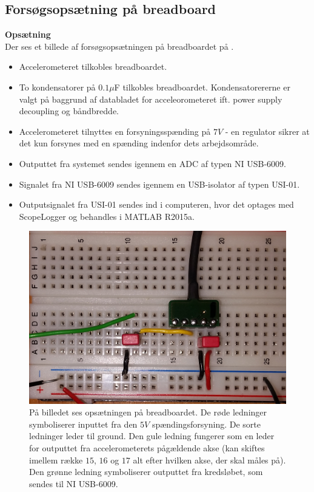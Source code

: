 \subsection{Forsøgsopsætning på breadboard}
\textbf{Opsætning}\\
Der ses et billede af forsøgsopsætningen på breadboardet på .
\begin{itemize}
\item Accelerometeret tilkobles breadboardet.
\item To kondensatorer på $0.1\mu$F tilkobles breadboardet. Kondensatorererne er valgt på baggrund af databladet for acceleorometeret ift. power supply decoupling og båndbredde.
\item Accelerometeret tilnyttes en forsyningsspænding på $7V$ - en regulator sikrer at det kun forsynes med en spænding indenfor dets arbejdsområde.
\item Outputtet fra systemet sendes igennem en ADC af typen NI USB-6009.
\item Signalet fra NI USB-6009 sendes igennem en USB-isolator af typen USI-01.
\item Outputsignalet fra USI-01 sendes ind i computeren, hvor det optages med ScopeLogger og behandles i MATLAB R2015a.
\end{itemize}

\begin{figure}[H]
	\centering
	\includegraphics[scale=0.15]{figures/cProblemloesning/PF2.jpg}
	\caption{På billedet ses opsætningen på breadboardet. De røde ledninger symboliserer inputtet fra den $5V$ spændingsforsyning. De sorte ledninger leder til ground. Den gule ledning fungerer som en leder for outputtet fra accelerometerets pågældende akse (kan skiftes imellem række $15$, $16$ og $17$ alt efter hvilken akse, der skal måles på). Den grønne ledning symboliserer outputtet fra kredsløbet, som sendes til NI USB-6009.}
	\label{pforsoeg1}
\end{figure}


